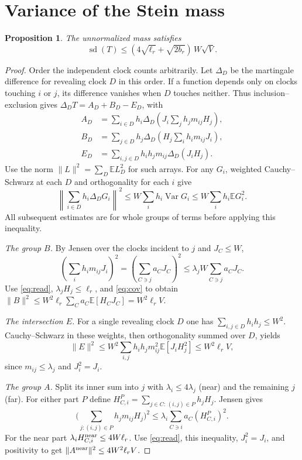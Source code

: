 \documentclass[11pt]{article}
\newtheorem{prop}[theorem]{Proposition}
\newcommand{\E}{\mathbb E}
\newcommand{\Var}{\operatorname{Var}}
\newcommand{\sd}{\operatorname{sd}}
\numberwithin{equation}{section}
\begin{document}
\section{Variance of the Stein mass}\label{sec:variance}
\begin{prop}\label{prop:mass}
The unnormalized mass satisfies
\[
 \sd(T)\le (4\sqrt{\ell_r}+\sqrt{2b_r})\,W\sqrt V.
\]
\end{prop}
\begin{proof}
Order the independent clock counts arbitrarily. Let $\Delta_D$ be the martingale
difference for revealing clock $D$ in this order. If a function depends only
on clocks touching $i$ or $j$, its difference vanishes when $D$ touches neither.
Thus inclusion--exclusion gives $\Delta_D T=A_D+B_D-E_D$, with
\begin{align*}
 A_D &=\sum_{i\in D} h_i\Delta_D\!\left(J_i\sum_j h_jm_{ij}H_j\right),\\
 B_D &=\sum_{j\in D} h_j\Delta_D\!\left(H_j\sum_i h_im_{ij}J_i\right),\\
 E_D &=\sum_{i,j\in D}h_ih_jm_{ij}\Delta_D(J_iH_j).
\end{align*}
Use the norm $\|L\|^2=\sum_D\E L_D^2$ for such arrays. For any $G_i$,
weighted Cauchy--Schwarz at each $D$ and orthogonality for each $i$ give
\begin{equation}\label{eq:read}
 \left\|\sum_{i\in D}h_i\Delta_D G_i\right\|^2
 \le W\sum_i h_i\Var G_i\le W\sum_i h_i\E G_i^2 .
\end{equation}
All subsequent estimates are for whole groups of terms before applying this inequality.

\smallskip\noindent\emph{The group $B$.}
By Jensen over the clocks incident to $j$ and $J_C\le W$,
\[
 (\sum_i h_i m_{ij}J_i)^2
 =(\sum_{C\ni j}a_CJ_C)^2\le\lambda_jW\sum_{C\ni j}a_CJ_C .
\]
Use \eqref{eq:read}, $\lambda_jH_j\le\ell_r$, and \eqref{eq:cov} to obtain
$\|B\|^2\le W^2\ell_r\sum_C a_C\E[H_CJ_C]=W^2\ell_r V$.

\smallskip\noindent\emph{The intersection $E$.}
For a single revealing clock $D$ one has $\sum_{i,j\in D}h_ih_j\le W^2$.
Cauchy--Schwarz in these weights, then orthogonality summed over $D$, yields
\[
 \|E\|^2\le W^2\sum_{i,j}h_i h_jm_{ij}^2\E[J_i H_j^2]
 \le W^2\ell_r V,
\]
since $m_{ij}\le\lambda_j$ and $J_i^2=J_i$.

\smallskip\noindent\emph{The group $A$.}
Split its inner sum into $j$ with $\lambda_i\le4\lambda_j$ (near) and the
remaining $j$ (far). For either part $P$ define
$H_{C,i}^{P}=\sum_{j\in C:\,(i,j)\in P}h_jH_j$. Jensen gives
\[
 \big(\sum_{j:(i,j)\in P}h_jm_{ij}H_j\big)^2
 \le \lambda_i\sum_{C\ni i}a_C(H_{C,i}^{P})^2 .
\]
For the near part $\lambda_i H_{C,i}^{\rm near}\le4W\ell_r$.
Use \eqref{eq:read}, this inequality, $J_i^2=J_i$, and positivity to get
$\|A^{\rm near}\|^2\le4 W^2\ell_r V$.


\end{proof}
\end{document}

